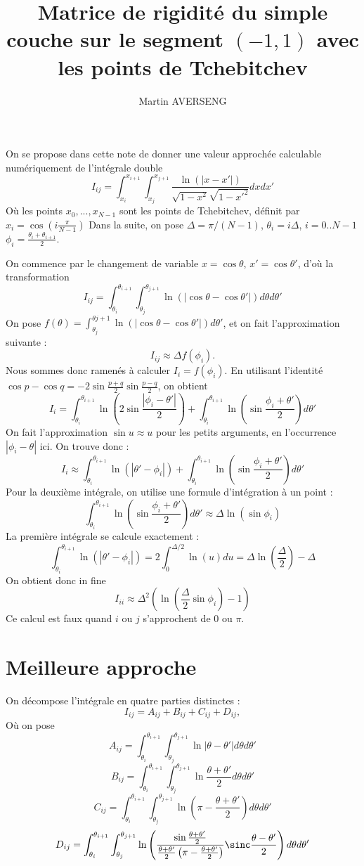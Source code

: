 \documentclass[11pt,a4paper]{article}
\author{Martin AVERSENG}
\title{Matrice de rigidité du simple couche sur le segment $(-1,1)$ avec les points de Tchebitchev}
\begin{document}
	\maketitle
	On se propose dans cette note de donner une valeur approchée calculable numériquement de l'intégrale double
	\[I_{ij} = \int_{x_i}^{x_{i+1}} \int_{x_j}^{x_{j+1}} \dfrac{\ln(|x - x'|)}{\sqrt{1-x^2}\sqrt{1- x'^2}}dx dx' \]
	Où les points $x_0,...,x_{N-1}$ sont les points de Tchebitchev, définit par $x_i = \cos\left(i\frac{\pi}{N-1}\right)$
	Dans la suite, on pose $\Delta = \pi/(N-1)$, $\theta_i = i \Delta$, $i = 0.. N-1$ $\phi_i = \frac{\theta_i + \theta_{i+1}}{2}$. 
	
	On commence par le changement de variable $x = \cos{\theta}$, $x' = \cos\theta'$, d'où la transformation 
	\[I_{ij} = \int_{\theta_i}^{\theta_{i+1}} \int_{\theta_j}^{\theta_{j+1}} \ln(|\cos \theta - \cos \theta'|) d\theta d\theta'\]
	On pose $f(\theta) = \int_{\theta_j}^{\theta{j+1}} \ln(|\cos \theta - \cos \theta'|) d\theta'$, et on fait l'approximation suivante : 
	\[ I_{ij} \approx \Delta f(\phi_i).\]
	Nous sommes donc ramenés à calculer $I _i = f(\phi_i)$. 
	En utilisant l'identité $\cos p - \cos q = -2 \sin \frac{p+q}{2} \sin \frac{p-q}{2}$, on obtient 
	\[I_i = \int_{\theta_i}^{\theta_{i+1}}\ln\left(2 \sin \frac{|\phi_i - \theta'|}{2}\right) + \int_{\theta_i}^{\theta_{i+1}}\ln\left(\sin\dfrac{\phi_i+\theta'}{2}\right)d\theta'  \]
	On fait l'approximation $\sin u \approx u$ pour les petits arguments, en l'occurrence $|\phi_i - \theta|$ ici. On trouve donc : 
	\[I_i \approx \int_{\theta_i}^{\theta_{i+1}}\ln\left(|\theta'-\phi_i|\right) + \int_{\theta_i}^{\theta_{i+1}}\ln\left(\sin\dfrac{\phi_i+\theta'}{2}\right)d\theta' \]
	Pour la deuxième intégrale, on utilise une formule d'intégration à un point : 
	\[ \int_{\theta_i}^{\theta_{i+1}}\ln\left(\sin\dfrac{\phi_i+\theta'}{2}\right)d\theta' \approx \Delta \ln(\sin \phi_i) \]
	La première intégrale se calcule exactement : 
	\[\int_{\theta_i}^{\theta_{i+1}}\ln\left(|\theta'-\phi_i|\right) = 2\int_{0}^{\Delta /2} \ln(u)du = \Delta\ln\left(\frac{\Delta}{2}\right)- \Delta\]
	On obtient donc in fine 
	\[ I_{ii} \approx \Delta^2 \left( \ln \left( \frac{\Delta}{2}\sin \phi_i\right) - 1\right)\]
	Ce calcul est faux quand $i$ ou $j$ s'approchent de $0$ ou $\pi$.
	\section{Meilleure approche}
	On décompose l'intégrale en quatre parties distinctes : 
	\[ I_{ij} = A_{ij} + B_{ij} + C_{ij} + D_{ij}, \]
	Où on pose 
	\[A_{ij} = \int_{\theta_i}^{\theta_{i+1}}\int_{\theta_j}^{\theta_{j+1}} \ln|\theta - \theta'|d\theta d\theta'\]
	\[B_{ij} = \int_{\theta_i}^{\theta_{i+1}}\int_{\theta_j}^{\theta_{j+1}} \ln \frac{\theta + \theta'}{2} d\theta d\theta'\]
	\[C_{ij} = \int_{\theta_i}^{\theta_{i+1}}\int_{\theta_j}^{\theta_{j+1}} \ln \left(\pi - \frac{\theta + \theta'}{2}\right)d\theta d\theta'\]
	\[D_{ij} = \int_{\theta_i}^{\theta_{i+1}}\int_{\theta_j}^{\theta_{j+1}} \ln \left(\frac{\sin\frac{\theta + \theta'}{2}}{\frac{\theta + \theta'}{2} \left(\pi-\frac{\theta + \theta'}{2}\right)}\sinc \frac{\theta-\theta'}{2}\right)d\theta d\theta'\]
	
\end{document}
